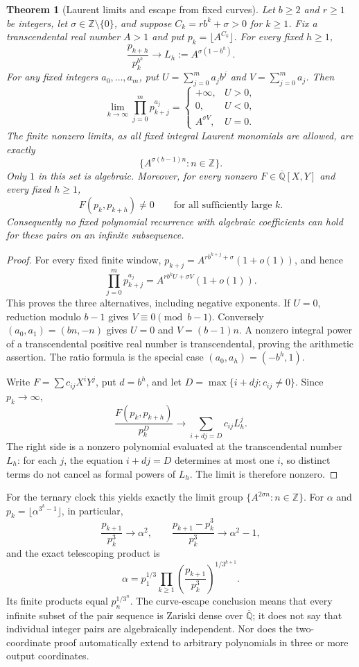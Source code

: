 \documentclass[11pt,a4paper]{article}
\newtheorem{theorem}{Theorem}[section]
\theoremstyle{definition}\newtheorem{definition}[theorem]{Definition}
\theoremstyle{remark}\newtheorem{remark}[theorem]{Remark}
\begin{document}
\begin{theorem}[Laurent limits and escape from fixed curves]
\label{init:affine-outputs}
Let $b\ge2$ and $r\ge1$ be integers, let $\sigma\in\mathbb Z\setminus\{0\}$,
and suppose $C_k=rb^k+\sigma>0$ for $k\ge1$. Fix a transcendental
real number $A>1$ and put $p_k=\lfloor A^{C_k}\rfloor$.
For every fixed $h\ge1$,
\[
 \frac{p_{k+h}}{p_k^{b^h}}\longrightarrow
 L_h:=A^{\sigma(1-b^h)}.
\]
For any fixed integers $a_0,\ldots,a_m$, put
$U=\sum_{j=0}^m a_jb^j$ and $V=\sum_{j=0}^m a_j$. Then
\[
 \lim_{k\to\infty}\prod_{j=0}^m p_{k+j}^{a_j}
 =\begin{cases}
 +\infty,&U>0,\\
 0,&U<0,\\
 A^{\sigma V},&U=0.
 \end{cases}
\]
The finite nonzero limits, as all fixed integral Laurent monomials are
allowed, are exactly
\[
 \{A^{\sigma(b-1)n}:n\in\mathbb Z\}.
\]
Only $1$ in this set is algebraic. Moreover, for every nonzero
$F\in\overline{\mathbb Q}[X,Y]$ and every fixed $h\ge1$,
\[
 F(p_k,p_{k+h})\ne0\qquad\text{for all sufficiently large }k.
\]
Consequently no fixed polynomial recurrence with algebraic coefficients
can hold for these pairs on an infinite subsequence.
\end{theorem}
\begin{proof}
For every fixed finite window,
$p_{k+j}=A^{rb^{k+j}+\sigma}(1+o(1))$, and hence
\[
 \prod_{j=0}^m p_{k+j}^{a_j}
 =A^{rb^kU+\sigma V}(1+o(1)).
\]
This proves the three alternatives, including negative exponents.
If $U=0$, reduction modulo $b-1$ gives $V\equiv0\pmod{b-1}$.
Conversely $(a_0,a_1)=(bn,-n)$ gives $U=0$ and $V=(b-1)n$.
A nonzero integral power of a transcendental positive real number is
transcendental, proving the arithmetic assertion.
The ratio formula is the special case $(a_0,a_h)=(-b^h,1)$.

Write $F=\sum c_{ij}X^iY^j$, put $d=b^h$, and let
$D=\max\{i+dj:c_{ij}\ne0\}$. Since $p_k\to\infty$,
\[
 \frac{F(p_k,p_{k+h})}{p_k^D}
 \longrightarrow\sum_{i+dj=D}c_{ij}L_h^j.
\]
The right side is a nonzero polynomial evaluated at the transcendental
number $L_h$: for each $j$, the equation $i+dj=D$ determines at most
one $i$, so distinct terms do not cancel as formal powers of $L_h$.
The limit is therefore nonzero.
\end{proof}

For the ternary clock this yields exactly the limit group
$\{A^{2\sigma n}:n\in\mathbb Z\}$. For $\alpha$ and
$p_k=\lfloor\alpha^{3^k-1}\rfloor$, in particular,
\[
 \frac{p_{k+1}}{p_k^3}\to\alpha^2,\qquad
 \frac{p_{k+1}-p_k^3}{p_k^3}\to\alpha^2-1,
\]
and the exact telescoping product is
\[
 \alpha=p_1^{1/3}\prod_{k\ge1}
       \left(\frac{p_{k+1}}{p_k^3}\right)^{1/3^{k+1}}.
\]
Its finite products equal $p_n^{1/3^n}$.
The curve-escape conclusion means that every infinite subset of the
pair sequence is Zariski dense over $\overline{\mathbb Q}$; it does
not say that individual integer pairs are algebraically independent.
Nor does the two-coordinate proof automatically extend to arbitrary
polynomials in three or more output coordinates.
\end{document}
